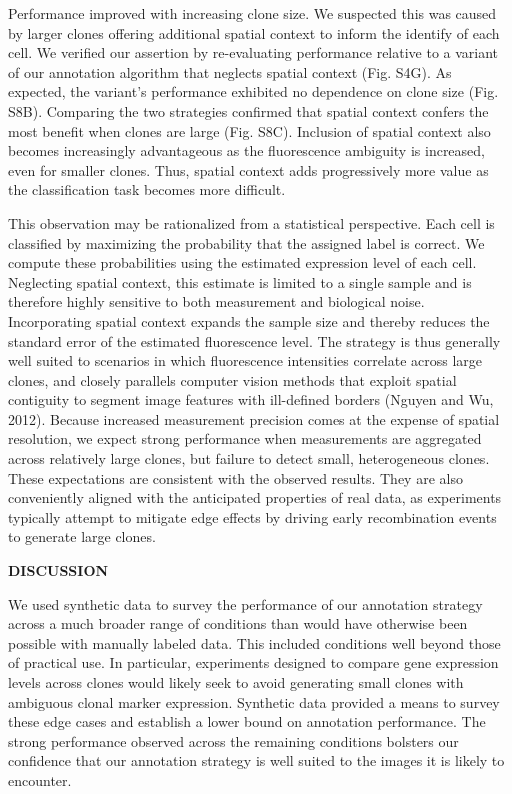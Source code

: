 Performance improved with increasing clone size. We suspected this was caused by larger clones offering additional spatial context to inform the identify of each cell. We verified our assertion by re-evaluating performance relative to a variant of our annotation algorithm that neglects spatial context (Fig. S4G). As expected, the variant's performance exhibited no dependence on clone size (Fig. S8B). Comparing the two strategies confirmed that spatial context confers the most benefit when clones are large (Fig. S8C). Inclusion of spatial context also becomes increasingly advantageous as the fluorescence ambiguity is increased, even for smaller clones. Thus, spatial context adds progressively more value as the classification task becomes more difficult.

This observation may be rationalized from a statistical perspective. Each cell is classified by maximizing the probability that the assigned label is correct. We compute these probabilities using the estimated expression level of each cell. Neglecting spatial context, this estimate is limited to a single sample and is therefore highly sensitive to both measurement and biological noise. Incorporating spatial context expands the sample size and thereby reduces the standard error of the estimated fluorescence level. The strategy is thus generally well suited to scenarios in which fluorescence intensities correlate across large clones, and closely parallels computer vision methods that exploit spatial contiguity to segment image features with ill-defined borders (Nguyen and Wu, 2012). Because increased measurement precision comes at the expense of spatial resolution, we expect strong performance when measurements are aggregated across relatively large clones, but failure to detect small, heterogeneous clones. These expectations are consistent with the observed results. They are also conveniently aligned with the anticipated properties of real data, as experiments typically attempt to mitigate edge effects by driving early recombination events to generate large clones.

\textbf{DISCUSSION}

We used synthetic data to survey the performance of our annotation strategy across a much broader range of conditions than would have otherwise been possible with manually labeled data. This included conditions well beyond those of practical use. In particular, experiments designed to compare gene expression levels across clones would likely seek to avoid generating small clones with ambiguous clonal marker expression. Synthetic data provided a means to survey these edge cases and establish a lower bound on annotation performance. The strong performance observed across the remaining conditions bolsters our confidence that our annotation strategy is well suited to the images it is likely to encounter.


